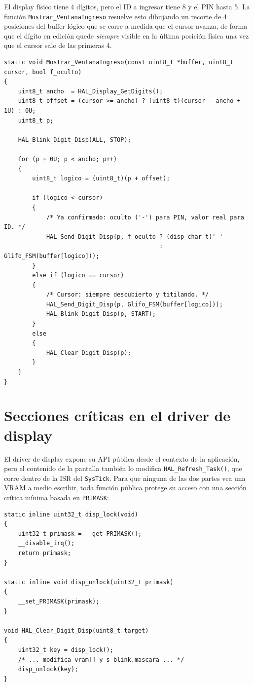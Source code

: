 \documentclass[11pt,a4paper]{article}
\begin{document}
El display físico tiene 4 dígitos, pero el ID a ingresar tiene 8 y el PIN
hasta 5. La función \lstinline{Mostrar_VentanaIngreso} resuelve esto
dibujando un recorte de 4 posiciones del buffer lógico que se corre a
medida que el cursor avanza, de forma que el dígito en edición quede
\emph{siempre} visible en la última posición física una vez que el cursor
sale de las primeras 4.

\begin{lstlisting}[caption={Ventana deslizante: proyecta un buffer lógico largo sobre 4 dígitos físicos.}, label={lst:ventana}]
static void Mostrar_VentanaIngreso(const uint8_t *buffer, uint8_t cursor, bool f_oculto)
{
    uint8_t ancho  = HAL_Display_GetDigits();
    uint8_t offset = (cursor >= ancho) ? (uint8_t)(cursor - ancho + 1U) : 0U;
    uint8_t p;

    HAL_Blink_Digit_Disp(ALL, STOP);

    for (p = 0U; p < ancho; p++)
    {
        uint8_t logico = (uint8_t)(p + offset);

        if (logico < cursor)
        {
            /* Ya confirmado: oculto ('-') para PIN, valor real para ID. */
            HAL_Send_Digit_Disp(p, f_oculto ? (disp_char_t)'-'
                                            : Glifo_FSM(buffer[logico]));
        }
        else if (logico == cursor)
        {
            /* Cursor: siempre descubierto y titilando. */
            HAL_Send_Digit_Disp(p, Glifo_FSM(buffer[logico]));
            HAL_Blink_Digit_Disp(p, START);
        }
        else
        {
            HAL_Clear_Digit_Disp(p);
        }
    }
}
\end{lstlisting}


\section{Secciones críticas en el driver de display}

El driver de display expone su API pública desde el contexto de la
aplicación, pero el contenido de la pantalla también lo modifica
\lstinline{HAL_Refresh_Task()}, que corre dentro de la ISR del
\lstinline{SysTick}. Para que ninguna de las dos partes vea una VRAM a
medio escribir, toda función pública protege su acceso con una sección
crítica mínima basada en \lstinline{PRIMASK}:

\begin{lstlisting}[caption={Sección crítica mínima usando \texttt{PRIMASK} (\texttt{display.c}).}, label={lst:critsection}]
static inline uint32_t disp_lock(void)
{
    uint32_t primask = __get_PRIMASK();
    __disable_irq();
    return primask;
}

static inline void disp_unlock(uint32_t primask)
{
    __set_PRIMASK(primask);
}

void HAL_Clear_Digit_Disp(uint8_t target)
{
    uint32_t key = disp_lock();
    /* ... modifica vram[] y s_blink.mascara ... */
    disp_unlock(key);
}
\end{lstlisting}
\end{document}
